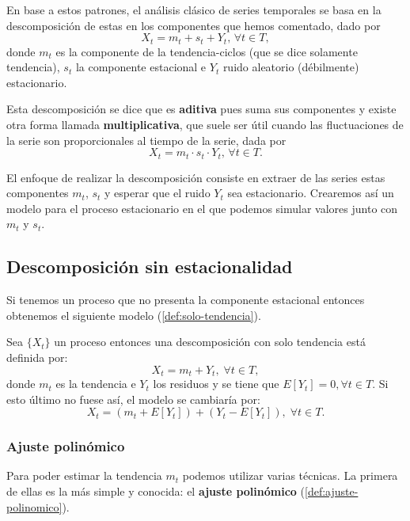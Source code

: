 En base a estos patrones, el análisis clásico de series temporales se basa en la descomposición de estas en los componentes que hemos comentado, dado por
\begin{equation*}
  X_t = m_t + s_t + Y_t, \, \forall t \in T,
  \label{eq:decomposition}
\end{equation*}
donde $m_t$ es la componente de la tendencia-ciclos (que se dice solamente tendencia), $s_t$ la componente estacional e $Y_t$ ruido aleatorio (débilmente) estacionario.

Esta descomposición se dice que es \textbf{aditiva} pues suma sus componentes y existe otra forma llamada \textbf{multiplicativa}, que suele ser útil cuando las fluctuaciones de la serie son proporcionales al tiempo de la serie, dada por
\begin{equation*}
  X_t = m_t \cdot s_t \cdot Y_t, \, \forall t \in T.
  \label{eq:decomposition-mult}
\end{equation*}

El enfoque de realizar la descomposición consiste en extraer de las series estas componentes $m_t$, $s_t$ y esperar que el ruido $Y_t$ sea estacionario. Crearemos así un modelo para el proceso estacionario en el que podemos simular valores junto con $m_t$ y $s_t$.

\subsection{Descomposición sin estacionalidad}

Si tenemos un proceso que no presenta la componente estacional entonces obtenemos el siguiente modelo (\autoref{def:solo-tendencia}).

\begin{definicion}
  Sea $\{X_t\}$ un proceso entonces una descomposición con solo tendencia está definida por:
  $$ X_t = m_t + Y_t, \; \forall t \in T,$$
  donde $m_t$ es la tendencia e $Y_t$ los residuos y se tiene que $E[Y_t] = 0, \forall t \in T$. Si esto último no fuese así, el modelo se cambiaría por:
  $$ X_t = (m_t + E[Y_t]) + (Y_t - E[Y_t]), \; \forall t \in T.$$
  \label{def:solo-tendencia}
\end{definicion}

\subsubsection{Ajuste polinómico}

Para poder estimar la tendencia $m_t$ podemos utilizar varias técnicas. La primera de ellas es la más simple y conocida: el \textbf{ajuste polinómico} (\autoref{def:ajuste-polinomico}).

